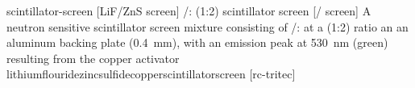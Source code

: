 \newglsXequipment%
{scintillator-screen}%
[LiF/ZnS screen]%
{{}/: (1:2) scintillator screen}%
[{}/ screen]%
{A neutron sensitive scintillator screen mixture consisting of /: at a (1:2) ratio an an aluminum backing plate (\SI{0.4}{\milli\meter}), with an emission peak at \SI{530}{\nano\meter} (green) resulting from the copper activator}%
{lithiumflouridezincsulfidecopperscintillatorscreen}%
[rc-tritec]%